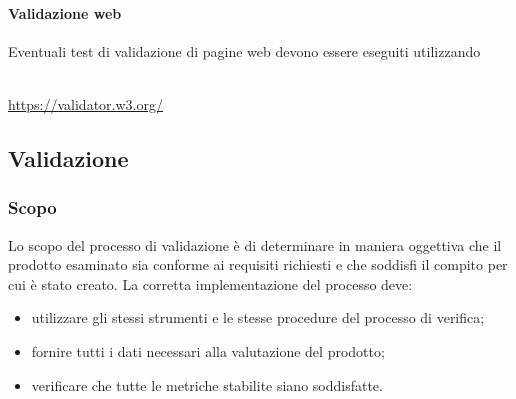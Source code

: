             \paragraph{Validazione web}
            Eventuali test di validazione di pagine web devono essere eseguiti utilizzando\\\\
            \centerline{\url{https://validator.w3.org/}}

    \subsection{Validazione}
    \subsubsection{Scopo}
    Lo scopo del processo di validazione è di determinare in maniera oggettiva che il prodotto esaminato sia conforme ai requisiti richiesti e che soddisfi il compito per cui è stato creato. La corretta implementazione del processo deve:
    \begin{itemize}
        \item utilizzare gli stessi strumenti e le stesse procedure del processo di verifica;
        \item fornire tutti i dati necessari alla valutazione del prodotto;
        \item verificare che tutte le metriche stabilite siano soddisfatte.
    \end{itemize}
